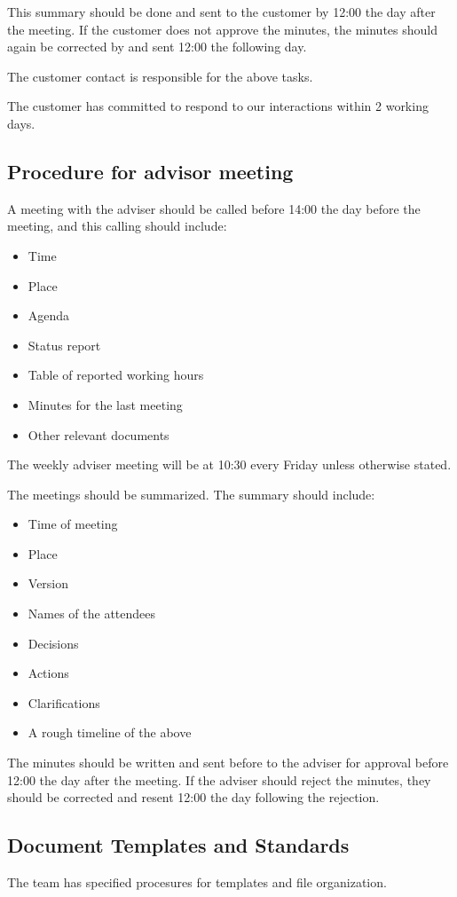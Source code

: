 This summary should be done and sent to the customer by 12:00 the day after the meeting. If the customer does not approve the minutes, the minutes should again be corrected by and sent 12:00 the following day.

The customer contact is responsible for the above tasks.

The customer has committed to respond to our interactions within 2 working days.

\subsection{Procedure for advisor meeting}
A meeting with the adviser should be called before 14:00 the day before the meeting, and this calling should include:
\begin{itemize}
	\item Time
	\item Place
	\item Agenda
	\item Status report
	\item Table of reported working hours
	\item Minutes for the last meeting
	\item Other relevant documents
\end{itemize}

The weekly adviser meeting will be at 10:30 every Friday unless otherwise stated.

The meetings should be summarized. The summary should include:
\begin{itemize}
	\item Time of meeting
	\item Place
	\item Version
	\item Names of the attendees
	\item Decisions
	\item Actions
	\item Clarifications
	\item A rough timeline of the above
\end{itemize}
The minutes should be written and sent before to the adviser for approval before 12:00 the day after the meeting. If the adviser should reject the minutes, they should be corrected and resent 12:00 the day following the rejection.

\subsection{Document Templates and Standards}
The team has specified procesures for templates and file organization.

